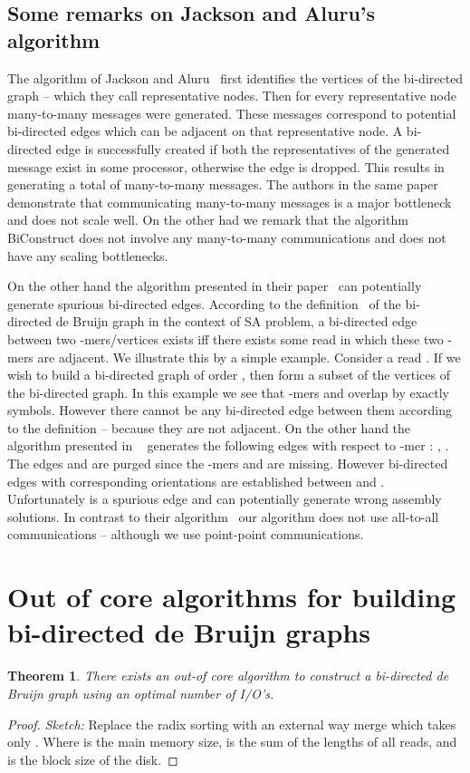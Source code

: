 \documentclass[11pt,conference,twocolumn]{IEEEtran}
\newtheorem{theorem}{Theorem}
\begin{document}
\subsection{Some remarks on Jackson and Aluru's algorithm}
\label{sec:remarks}
The algorithm of Jackson and Aluru~\cite{par_bidirected_graph}  first identifies the vertices of the bi-directed
graph -- which they call representative nodes. Then for every representative node  
many-to-many messages were generated. These messages correspond to potential bi-directed edges
which can be adjacent on that representative node. A bi-directed edge is successfully created
if both the representatives of the generated message exist in some processor, otherwise the
edge is dropped. This results in generating a total of  many-to-many messages.
The authors in the same paper demonstrate that communicating many-to-many messages is a major 
bottleneck and does not scale well. On the other had we remark that the algorithm {\sf BiConstruct}
does not involve any many-to-many communications and does not have any scaling bottlenecks. 

On the other hand the algorithm presented in their paper~\cite{par_bidirected_graph} can potentially 
generate spurious bi-directed edges. According to the definition~\cite{bidirected_graph} of the 
bi-directed de Bruijn graph in the context of SA problem, a bi-directed edge between two -mers/vertices
exists iff there exists some read in which these two -mers are adjacent. We illustrate this by a simple
example. Consider a read . If we wish to build a bi-directed graph of order , then
 form a subset of the vertices of the bi-directed graph. In this example
we see that -mers  and  overlap by exactly  symbols. However there cannot be any 
bi-directed edge between them according to the definition -- because they are not adjacent. On the other hand
the algorithm presented in ~\cite{par_bidirected_graph} generates the following edges with respect
to -mer : , . The edges  and 
are purged since the -mers  and  are missing. However bi-directed edges with corresponding orientations
are established between  and . Unfortunately  is a spurious edge and can potentially
generate wrong assembly solutions. In contrast to their algorithm~\cite{par_bidirected_graph} our algorithm 
does not use all-to-all communications -- although we use point-point communications.

\section{Out of core algorithms for building bi-directed de Bruijn graphs} 
\label{sec:out-of-core}
\begin{theorem}
There exists an out-of core algorithm to construct a bi-directed de Bruijn graph using an optimal number of
I/O's.
\end{theorem}
\begin{proof}
{\em Sketch:} Replace the radix sorting with an external way merge which takes only 
. Where  is the main memory size,  is the sum 
of the lengths of all reads, and  is the block size of the disk.
\end{proof}
\end{document}
